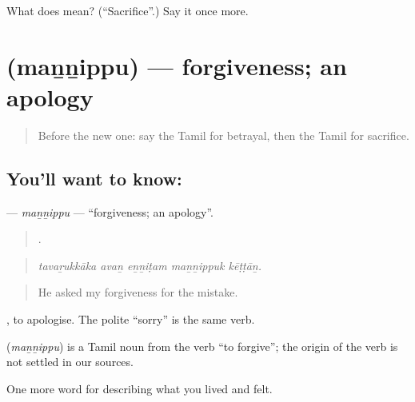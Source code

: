 \begin{tcolorbox}[breakable,colback=teal!4,colframe=teal!35!black,title={Before you move on}]
What does  mean? (\textquotedblleft{}Sacrifice\textquotedblright{}.) Say it once more.
\end{tcolorbox}
\section[\texorpdfstring{\ta{மன்னிப்பு} (maṉṉippu)}{மன்னிப்பு (maṉṉippu)}]{ (maṉṉippu) — forgiveness; an apology}

\label{lesson:TA-C470-mannippu}



\begin{quote}
Before the new one: say the Tamil for betrayal, then the Tamil for sacrifice.
\end{quote}

\subsection*{You'll want to know: }
\textbf{} — \emph{maṉṉippu} — \textquotedblleft{}forgiveness; an apology\textquotedblright{}.

\begin{quote}
    .
\end{quote}

\begin{quote}
\emph{tavaṟukkāka avaṉ eṉṉiṭam maṉṉippuk kēṭṭāṉ.}
\end{quote}

\begin{quote}
He asked my forgiveness for the mistake.
\end{quote}

 , to apologise. The polite  \textquotedblleft{}sorry\textquotedblright{} is the same verb.

\begin{cousinweb}
\textbf{} (\emph{maṉṉippu}) is a Tamil noun from the verb  \textquotedblleft{}to forgive\textquotedblright{}; the origin of the verb is not settled in our sources.
\end{cousinweb}

\begin{grammarlens}[title={What you've built}]
One more word for describing what you lived and felt.
\end{grammarlens}

